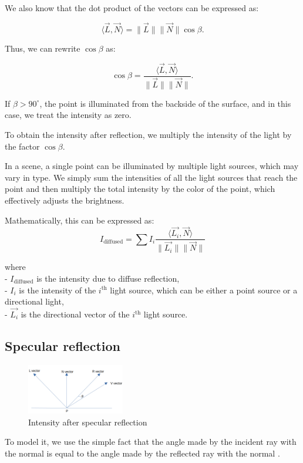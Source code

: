 \documentclass[conference]{IEEEtran}
\begin{document}
We also know that the dot product of the vectors can be expressed as:

$$\langle \vec{L}, \vec{N} \rangle = \|\vec{L}\| \|\vec{N}\| \cos \beta.$$

Thus, we can rewrite $ \cos \beta $ as:

$$\cos \beta = \frac{\langle \vec{L}, \vec{N} \rangle}{\|\vec{L}\| \|\vec{N}\|}.$$

If $ \beta > 90^\circ $, the point is illuminated from the backside of the surface, and in this case, we treat the intensity as zero.

To obtain the intensity after reflection, we multiply the intensity of the light by the factor $ \cos \beta $.

In a scene, a single point can be illuminated by multiple light sources, which may vary in type. We simply sum the intensities of all the light sources that reach the point and then multiply the total intensity by the color of the point, which effectively adjusts the brightness.

Mathematically, this can be expressed as:
\begin{equation}
    I_{\text{diffused}} = \sum I_i \frac{\langle \vec{L_i}, \vec{N} \rangle}{\|\vec{L_i}\| \|\vec{N}\|}
    \label{diffuse}
\end{equation}
    

where\\
- $ I_{\text{diffused}} $ is the intensity due to diffuse reflection,\\
- $ I_i $ is the intensity of the $ i^{\text{th}} $ light source, which can be either a point source or a directional light,\\
- $ \vec{L_i} $ is the directional vector of the $ i^{\text{th}} $ light source.




\subsection{Specular reflection}

\begin{figure}[htbp]
    \centerline{\includegraphics[width=0.38\textwidth]{./figs/intensityspecular.png}}
    \caption{Intensity after specular reflection}

\end{figure}
To model it, we use the simple fact that the angle made by the incident ray with the normal is equal to the angle made by the reflected ray with the normal .
\end{document}
